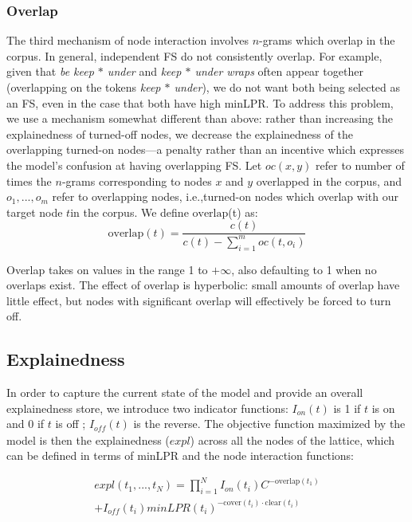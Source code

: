 \documentclass[11pt,letterpaper]{article}
\makeatletter
\def \ie {i.e.,\@ }
\newcommand{\dotts}{...}
\newcommand{\gap}{$*$\xspace}
\newcommand{\ex}[1]{\textit{#1}\xspace}
\newcommand{\cover}{\ensuremath{\text{cover}}\xspace}
\newcommand{\clear}{\ensuremath{\text{clear}}\xspace}
\newcommand{\overlap}{\ensuremath{\text{overlap}}\xspace}
\makeatother
\begin{document}
\subsubsection{Overlap}

The third mechanism of node interaction involves $n$-grams which overlap in the corpus. In general, independent FS do not consistently overlap. For example, given that \ex{be keep \gap under} and \ex{keep \gap under wraps} often appear together (overlapping on the tokens \ex{keep \gap under}), we do not want both being selected as an FS, even in the case that both have high minLPR. To address this problem, we use a mechanism somewhat different than above: rather than increasing the explainedness of turned-off nodes, we decrease the explainedness of the overlapping turned-on nodes---a penalty rather than an incentive which expresses the model's confusion at having overlapping FS. Let $\mathit{oc}(x,y)$ refer to number of times the $n$-grams corresponding to nodes $x$ and $y$ overlapped in the corpus, and $o_1,\dotts,o_m$ refer to overlapping nodes, \ie turned-on nodes which overlap with our target node $t$in the corpus. We define \overlap(t) as:
\begin{displaymath}
	\overlap(t) = \frac{c(t)}{c(t) - \sum_{i=1}^{m}{\mathit{oc}(t,o_i)}}
\end{displaymath}

Overlap takes on values in the range 1 to $+\infty$, also defaulting to 1 when no overlaps exist. The effect of overlap is hyperbolic: small amounts of overlap have little effect, but nodes with significant overlap will effectively be forced to turn off. 

\subsection{Explainedness}

In order to capture the current state of the model and provide an overall explainedness store, we introduce two indicator functions: $I_{on}(t)$ is 1 if $t$ is on and 0 if $t$ is off ; $I_{\mathit{off}}(t)$ is the reverse. The objective function maximized by the model is then the explainedness ($expl$) across all the nodes of the lattice, which can be defined in terms of minLPR and the node interaction functions:

\begin{multline}
expl(t_1,...,t_N) = \prod_{i=1}^{N}{I_{on}(t_i)  C^{-\overlap(t_1)}} \\ + I_{\mathit{off}}(t_i) minLPR(t_i)^{-\cover(t_i) \cdot \clear(t_i)}
\end{multline}
\end{document}
